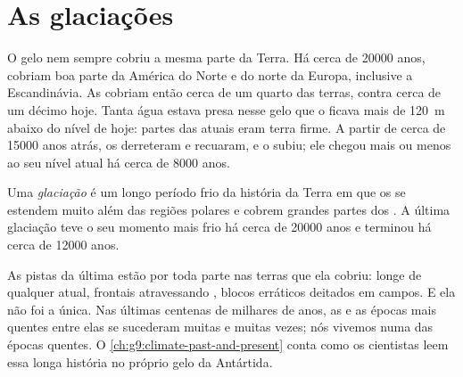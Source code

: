 \section{As glaciações}

O gelo nem sempre cobriu a mesma parte da Terra. Há cerca de \num{20000}
anos,  cobriam boa parte da América do Norte e do norte da
Europa, inclusive a Escandinávia.
As  cobriam então cerca de um quarto das terras, contra cerca de
um décimo hoje. Tanta água estava presa nesse gelo que o  ficava mais
de \qty{120}{m} abaixo do nível de hoje: partes das  atuais eram terra firme. A partir de cerca de \num{15000} anos atrás, os  derreteram e recuaram, e
o  subiu; ele chegou mais ou menos ao seu nível atual há cerca de
\num{8000} anos.

\begin{definition}[Glaciação]\label{def:g8:ice-on-earth:ice-age}
Uma \emph{glaciação} é um longo período frio da história da Terra em que
os  se estendem muito além das regiões polares e cobrem
grandes partes dos . A última glaciação teve o seu momento mais
frio há cerca de \num{20000} anos e terminou há cerca de \num{12000} anos.
\end{definition}

As pistas da última  estão por toda parte nas terras que ela
cobriu:  longe de qualquer  atual,  frontais
atravessando , blocos erráticos deitados em campos. E ela não foi
a única. Nas últimas centenas de milhares de anos, as  e as
épocas mais quentes entre elas se sucederam muitas e muitas vezes; nós
vivemos numa das épocas quentes. O \cref{ch:g9:climate-past-and-present}
conta como os cientistas leem essa longa história no próprio gelo da
Antártida.


